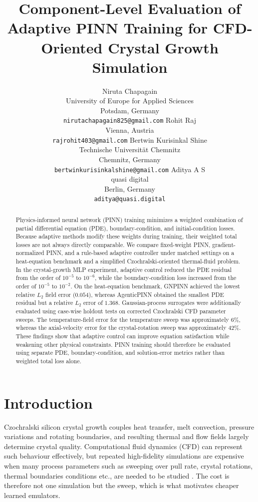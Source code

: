 \documentclass{article}
\title{Component-Level Evaluation of Adaptive PINN Training for CFD-Oriented Crystal Growth Simulation}
\author{
Niruta Chapagain\\
University of Europe for Applied Sciences\\
Potsdam, Germany\\
\texttt{nirutachapagain825@gmail.com}
\And
Rohit Raj\\
Vienna, Austria\\
\texttt{rajrohit403@gmail.com}
\And
Bertwin Kurisinkal Shine\\
Technische Universität Chemnitz\\
Chemnitz, Germany\\
\texttt{bertwinkurisinkalshine@gmail.com}
\And
Aditya A S\\
quasi digital\\
Berlin, Germany\\
\texttt{aditya@quasi.digital}
}
\begin{document}
\raggedbottom

\maketitle
\begin{abstract}
    Physics-informed neural network (PINN) training minimizes a weighted combination of partial differential equation (PDE), boundary-condition, and initial-condition losses. Because adaptive methods modify these weights during training, their weighted total losses are not always directly comparable. We compare fixed-weight PINN, gradient-normalized PINN, and a rule-based adaptive controller under matched settings on a heat-equation benchmark and a simplified Czochralski-oriented thermal-fluid problem. In the crystal-growth MLP experiment, adaptive control reduced the PDE residual from the order of $10^{-5}$ to $10^{-6}$, while the boundary-condition loss increased from the order of $10^{-5}$ to $10^{-2}$. On the heat-equation benchmark, GNPINN achieved the lowest relative $L_2$ field error ($0.054$), whereas AgenticPINN obtained the smallest PDE residual but a relative $L_2$ error of $1.368$. Gaussian-process surrogates were additionally evaluated using case-wise holdout tests on corrected Czochralski CFD parameter sweeps. The temperature-field error for the temperature sweep was approximately $6\%$, whereas the axial-velocity error for the crystal-rotation sweep was approximately $42\%$. These findings show that adaptive control can improve equation satisfaction while weakening other physical constraints. PINN training should therefore be evaluated using separate PDE, boundary-condition, and solution-error metrics rather than weighted total loss alone.
\end{abstract}

\section{Introduction}

Czochralski silicon crystal growth %
couples heat transfer, melt convection, pressure variations and rotating boundaries, and resulting thermal and flow fields largely determine crystal quality. %
Computational fluid dynamics (CFD) can represent such behaviour effectively, but repeated high-fidelity simulations are expensive when many process parameters such as sweeping over pull rate, crystal rotations, thermal boundaries conditions etc., are needed to be studied \citep{jin2013czfluidflow,enders2022czthermal}. The cost is therefore not one simulation but the sweep, which is what motivates cheaper learned emulators.
\end{document}
